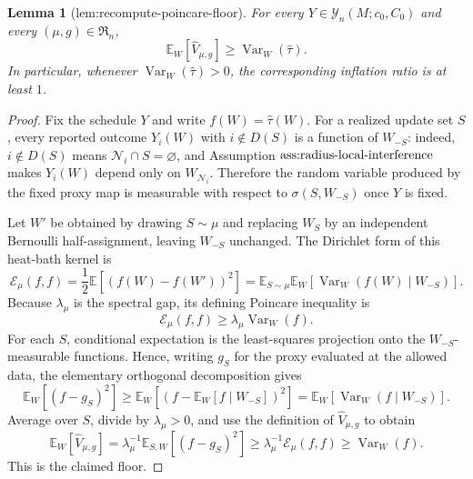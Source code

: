 \documentclass{article}
\newtheorem{lemma}{Lemma}
\begin{document}
\begin{lemma}[lem:recompute-poincare-floor]\label{lem:recompute-poincare-floor}
For every \(Y\in\mathcal Y_n(M;c_0,C_0)\) and every \((\mu,g)\in\mathfrak R_n\),\[\mathbb E_W[\widehat V_{\mu,g}]\ge\operatorname{Var}_W(\widehat\tau).\]In particular, whenever \(\operatorname{Var}_W(\widehat\tau)>0\), the corresponding inflation ratio is at least \(1\).
\end{lemma}
\begin{proof}
Fix the schedule \(Y\) and write \(f(W)=\widehat\tau(W)\). For a realized update set \(S\), every reported outcome \(Y_i(W)\) with \(i\notin D(S)\) is a function of \(W_{-S}\): indeed, \(i\notin D(S)\) means \(\mathcal N_i\cap S=\varnothing\), and Assumption \(\textnormal{ass:radius-local-interference}\) makes \(Y_i(W)\) depend only on \(W_{\mathcal N_i}\). Therefore the random variable produced by the fixed proxy map is measurable with respect to \(\sigma(S,W_{-S})\) once \(Y\) is fixed.

Let \(W'\) be obtained by drawing \(S\sim\mu\) and replacing \(W_S\) by an independent Bernoulli half-assignment, leaving \(W_{-S}\) unchanged. The Dirichlet form of this heat-bath kernel is\[\mathcal E_\mu(f,f)=\frac12\mathbb E[(f(W)-f(W'))^2]=\mathbb E_{S\sim\mu}\mathbb E_W[\operatorname{Var}_W(f(W)\mid W_{-S})].\]Because \(\lambda_\mu\) is the spectral gap, its defining Poincare inequality is\[\mathcal E_\mu(f,f)\ge\lambda_\mu\operatorname{Var}_W(f).\]For each \(S\), conditional expectation is the least-squares projection onto the \(W_{-S}\)-measurable functions. Hence, writing \(g_S\) for the proxy evaluated at the allowed data, the elementary orthogonal decomposition gives\[\mathbb E_W[(f-g_S)^2]\ge\mathbb E_W[(f-\mathbb E_W[f\mid W_{-S}])^2]=\mathbb E_W[\operatorname{Var}_W(f\mid W_{-S})].\]Average over \(S\), divide by \(\lambda_\mu>0\), and use the definition of \(\widehat V_{\mu,g}\) to obtain\[\mathbb E_W[\widehat V_{\mu,g}]=\lambda_\mu^{-1}\mathbb E_{S,W}[(f-g_S)^2]\ge\lambda_\mu^{-1}\mathcal E_\mu(f,f)\ge\operatorname{Var}_W(f).\]This is the claimed floor.
\end{proof}
\end{document}
